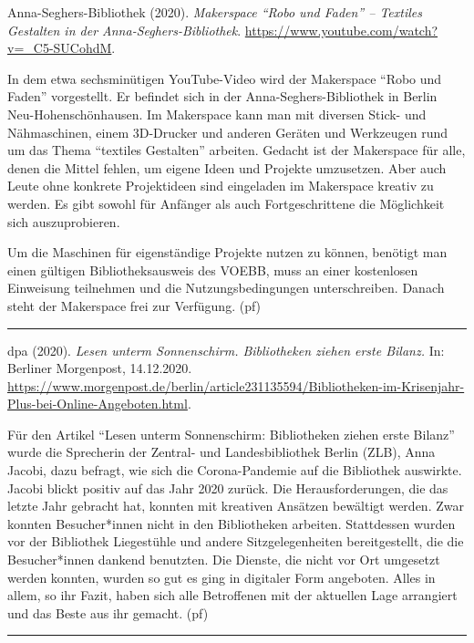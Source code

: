 \documentclass[a4paper,
fontsize=11pt,
oneside,
numbers=noperiodatend,
parskip=half-,
bibliography=totoc,
final
]{scrartcl}
\begin{document}
Anna-Seghers-Bibliothek (2020). \emph{Makerspace \enquote{Robo und
Faden} -- Textiles Gestalten in der Anna-Seghers-Bibliothek}.
\url{https://www.youtube.com/watch?v=_C5-SUCohdM}.

In dem etwa sechsminütigen YouTube-Video wird der Makerspace
\enquote{Robo und Faden} vorgestellt. Er befindet sich in der
Anna-Seghers-Bibliothek in Berlin Neu-Hohenschönhausen. Im Makerspace
kann man mit diversen Stick- und Nähmaschinen, einem 3D-Drucker und
anderen Geräten und Werkzeugen rund um das Thema \enquote{textiles
Gestalten} arbeiten. Gedacht ist der Makerspace für alle, denen die
Mittel fehlen, um eigene Ideen und Projekte umzusetzen. Aber auch Leute
ohne konkrete Projektideen sind eingeladen im Makerspace kreativ zu
werden. Es gibt sowohl für Anfänger als auch Fortgeschrittene die
Möglichkeit sich auszuprobieren.

Um die Maschinen für eigenständige Projekte nutzen zu können, benötigt
man einen gültigen Bibliotheksausweis des VOEBB, muss an einer
kostenlosen Einweisung teilnehmen und die Nutzungsbedingungen
unterschreiben. Danach steht der Makerspace frei zur Verfügung. (pf)

\begin{center}\rule{0.5\linewidth}{0.5pt}\end{center}

dpa (2020). \emph{Lesen unterm Sonnenschirm. Bibliotheken ziehen erste
Bilanz.} In: Berliner Morgenpost, 14.12.2020.
\url{https://www.morgenpost.de/berlin/article231135594/Bibliotheken-im-Krisenjahr-Plus-bei-Online-Angeboten.html}.

Für den Artikel \enquote{Lesen unterm Sonnenschirm: Bibliotheken ziehen
erste Bilanz} wurde die Sprecherin der Zentral- und Landesbibliothek
Berlin (ZLB), Anna Jacobi, dazu befragt, wie sich die Corona-Pandemie
auf die Bibliothek auswirkte. Jacobi blickt positiv auf das Jahr 2020
zurück. Die Herausforderungen, die das letzte Jahr gebracht hat, konnten
mit kreativen Ansätzen bewältigt werden. Zwar konnten Besucher*innen
nicht in den Bibliotheken arbeiten. Stattdessen wurden vor der
Bibliothek Liegestühle und andere Sitzgelegenheiten bereitgestellt, die
die Besucher*innen dankend benutzten. Die Dienste, die nicht vor Ort
umgesetzt werden konnten, wurden so gut es ging in digitaler Form
angeboten. Alles in allem, so ihr Fazit, haben sich alle Betroffenen mit
der aktuellen Lage arrangiert und das Beste aus ihr gemacht. (pf)

\begin{center}\rule{0.5\linewidth}{0.5pt}\end{center}
\end{document}
